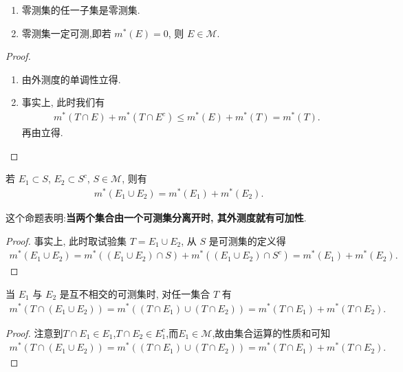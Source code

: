 \documentclass[../../main.tex]{subfiles}%
\begin{document}
\begin{proposition}\label{proposition:零测集的基本性质}
\begin{enumerate}
\item 零测集的任一子集是零测集.

\item 零测集一定可测,即若 \(m^*(E)=0\), 则 \(E \in \mathscr{M}\). 
\end{enumerate}
\end{proposition}
\begin{proof}
\begin{enumerate}
\item 由外测度的单调性立得.

\item 事实上, 此时我们有
\begin{align*}
m^*(T \cap E)+m^*(T \cap E^c) \leqslant  m^*(E)+m^*(T)=m^*(T).
\end{align*}
再由立得.
\end{enumerate}
\end{proof}

\begin{proposition}\label{proposition:外测度的可加性的条件}
若 \(E_1 \subset S\), \(E_2 \subset S^c\), \(S \in \mathscr{M}\), 则有
\begin{align*}
m^*(E_1 \cup E_2) = m^*(E_1) + m^*(E_2).
\end{align*}
\end{proposition}
\begin{remark}
这个命题表明:\textbf{当两个集合由一个可测集分离开时, 其外测度就有可加性}.
\end{remark}
\begin{proof}
事实上, 此时取试验集 \(T = E_1 \cup E_2\), 从 \(S\) 是可测集的定义得
\begin{align*}
m^*(E_1 \cup E_2) = m^*((E_1 \cup E_2) \cap S) + m^*((E_1 \cup E_2) \cap S^c) = m^*(E_1) + m^*(E_2).
\end{align*}
\end{proof}

\begin{corollary}\label{corollary:2个无交可测集与任意集合的并的外测度的性质}
当 \(E_1\) 与 \(E_2\) 是互不相交的可测集时, 对任一集合 \(T\) 有
\begin{align*}
m^*(T \cap (E_1 \cup E_2)) =m^*((T\cap E_1)\cup (T\cap E_2))= m^*(T \cap E_1) + m^*(T \cap E_2).
\end{align*} 
\end{corollary}
\begin{proof}
注意到$T\cap E_1\in E_1$,$T\cap E_2\in E_1^c$,而$E_1\in \mathscr{M}$,故由集合运算的性质和可知
\begin{align*}
m^*(T \cap (E_1 \cup E_2))=m^*((T\cap E_1)\cup (T\cap E_2)) = m^*(T \cap E_1) + m^*(T \cap E_2).
\end{align*} 
\end{proof}
\end{document}
